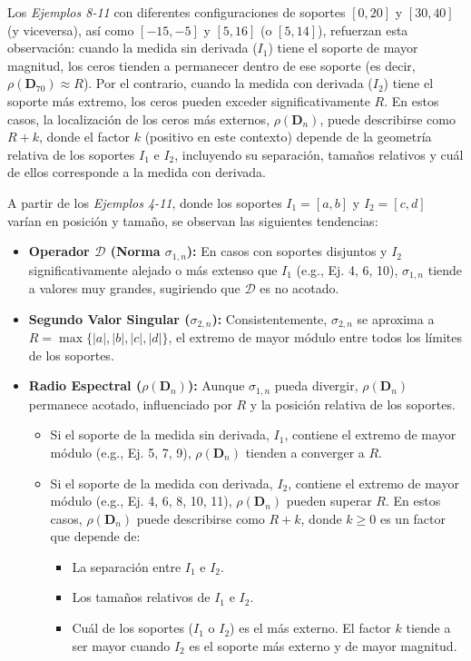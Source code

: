 Los \textit{Ejemplos 8-11} con diferentes configuraciones de soportes $[0,20]$ y $[30,40]$ (y viceversa), así como $[-15,-5]$ y $[5,16]$ (o $[5,14]$), refuerzan esta observación: cuando la medida sin derivada ($I_1$) tiene el soporte de mayor magnitud, los ceros tienden a permanecer dentro de ese soporte (es decir, $\rho(\mathbf{D}_{70}) \approx R$). Por el contrario, cuando la medida con derivada ($I_2$) tiene el soporte más extremo, los ceros pueden exceder significativamente $R$. En estos casos, la localización de los ceros más externos, $\rho(\mathbf{D}_n)$, puede describirse como $R + k$, donde el factor $k$ (positivo en este contexto) depende de la geometría relativa de los soportes $I_1$ e $I_2$, incluyendo su separación, tamaños relativos y cuál de ellos corresponde a la medida con derivada.

A partir de los \textit{Ejemplos 4-11}, donde los soportes $I_1=[a,b]$ y $I_2=[c,d]$ varían en posición y tamaño, se observan las siguientes tendencias:
\begin{itemize}
  \item \textbf{Operador $\mathcal{D}$ (Norma $\sigma_{1,n}$):} En casos con soportes disjuntos y $I_2$ significativamente alejado o más extenso que $I_1$ (e.g., Ej. 4, 6, 10), $\sigma_{1,n}$ tiende a valores muy grandes, sugiriendo que $\mathcal{D}$ es no acotado.
  \item \textbf{Segundo Valor Singular ($\sigma_{2,n}$):} Consistentemente, $\sigma_{2,n}$ se aproxima a $R = \max\{|a|,|b|,|c|,|d|\}$, el extremo de mayor módulo entre todos los límites de los soportes.
  \item \textbf{Radio Espectral ($\rho(\mathbf{D}_n)$):} Aunque $\sigma_{1,n}$ pueda divergir, $\rho(\mathbf{D}_n)$ permanece acotado, influenciado por $R$ y la posición relativa de los soportes.
        \begin{itemize}
          \item Si el soporte de la medida sin derivada, $I_1$, contiene el extremo de mayor módulo (e.g., Ej. 5, 7, 9), $\rho(\mathbf{D}_n)$ tienden a converger a $R$.
          \item Si el soporte de la medida con derivada, $I_2$, contiene el extremo de mayor módulo (e.g., Ej. 4, 6, 8, 10, 11), $\rho(\mathbf{D}_n)$ pueden superar $R$. En estos casos, $\rho(\mathbf{D}_n)$ puede describirse como $R + k$, donde $k \ge 0$ es un factor que depende de:
                \begin{itemize}
                  \item La separación entre $I_1$ e $I_2$.
                  \item Los tamaños relativos de $I_1$ e $I_2$.
                  \item Cuál de los soportes ($I_1$ o $I_2$) es el más externo. El factor $k$ tiende a ser mayor cuando $I_2$ es el soporte más externo y de mayor magnitud.
                \end{itemize}
        \end{itemize}
\end{itemize}


